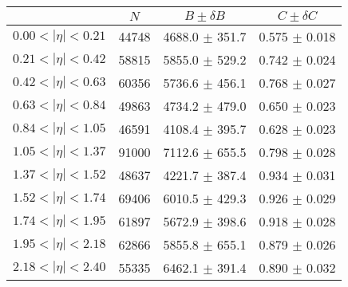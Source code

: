 \begin{tabular}{lccc}
\hline
    &   $N$   & $B \pm \delta B$  &  $C \pm \delta C$ \\
\hline
$0.00 < |\eta| <0.21$          & 44748      & 4688.0     $\pm$ 351.7 & 0.575      $\pm$ 0.018 \\
$0.21 < |\eta| <0.42$          & 58815      & 5855.0     $\pm$ 529.2 & 0.742      $\pm$ 0.024 \\
$0.42 < |\eta| <0.63$          & 60356      & 5736.6     $\pm$ 456.1 & 0.768      $\pm$ 0.027 \\
$0.63 < |\eta| <0.84$          & 49863      & 4734.2     $\pm$ 479.0 & 0.650      $\pm$ 0.023 \\
$0.84 < |\eta| <1.05$          & 46591      & 4108.4     $\pm$ 395.7 & 0.628      $\pm$ 0.023 \\
$1.05 < |\eta| <1.37$          & 91000      & 7112.6     $\pm$ 655.5 & 0.798      $\pm$ 0.028 \\
$1.37 < |\eta| <1.52$          & 48637      & 4221.7     $\pm$ 387.4 & 0.934      $\pm$ 0.031 \\
$1.52 < |\eta| <1.74$          & 69406      & 6010.5     $\pm$ 429.3 & 0.926      $\pm$ 0.029 \\
$1.74 < |\eta| <1.95$          & 61897      & 5672.9     $\pm$ 398.6 & 0.918      $\pm$ 0.028 \\
$1.95 < |\eta| <2.18$          & 62866      & 5855.8     $\pm$ 655.1 & 0.879      $\pm$ 0.026 \\
$2.18 < |\eta| <2.40$          & 55335      & 6462.1     $\pm$ 391.4 & 0.890      $\pm$ 0.032 \\
\hline
\end{tabular}
